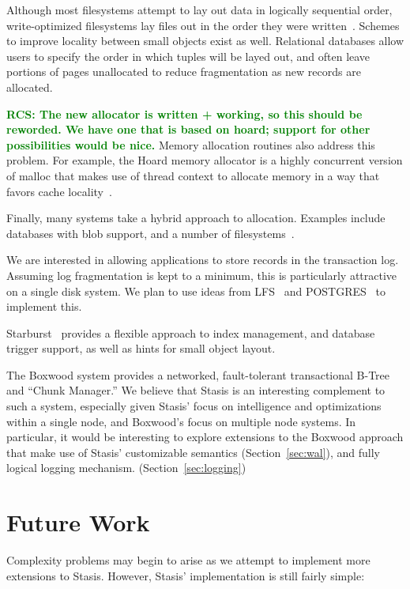 \documentclass[letterpaper,twocolumn,10pt]{article}
\newcommand{\yad}{Stasis\xspace}
\newcommand{\yads}{Stasis'\xspace}
\newcommand{\rcs}[1]{\textcolor{green}{\bf RCS: #1}}
\begin{document}
Although most filesystems attempt to lay out data in logically sequential
order, write-optimized filesystems lay files out in the order they
were written~\cite{lfs}.  Schemes to improve locality between small
objects exist as well. Relational databases allow users to specify the order
in which tuples will be layed out, and often leave portions of pages
unallocated to reduce fragmentation as new records are allocated.

\rcs{The new allocator is written + working, so this should be reworded. We have one that is based on hoard; support for other possibilities would be nice.}
Memory allocation routines also address this problem.  For example, the Hoard memory
allocator is a highly concurrent version of malloc that
makes use of thread context to allocate memory in a way that favors
cache locality~\cite{hoard}.  %

Finally, many systems take a hybrid approach to allocation.  Examples include
databases with blob support, and a number of
filesystems~\cite{reiserfs,ffs}.

We are interested in allowing applications to store records in
the transaction log.  Assuming log fragmentation is kept to a
minimum, this is particularly attractive on a single disk system.  We
plan to use ideas from LFS~\cite{lfs} and POSTGRES~\cite{postgres}
to implement this.

Starburst~\cite{starburst} provides a flexible approach to index
management, and database trigger support, as well as hints for small
object layout.

The Boxwood system provides a networked, fault-tolerant transactional
B-Tree and ``Chunk Manager.''  We believe that \yad is an interesting
complement to such a system, especially given \yads focus on
intelligence and optimizations within a single node, and Boxwood's
focus on multiple node systems.  In particular, it would be
interesting to explore extensions to the Boxwood approach that make
use of \yads customizable semantics (Section~\ref{sec:wal}), and fully logical logging
mechanism. (Section~\ref{sec:logging})

\section{Future Work}

Complexity problems may begin to arise as we attempt to implement more
extensions to \yad.  However, \yads implementation is still fairly simple:
\end{document}
